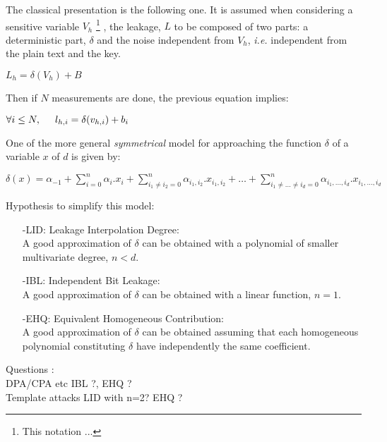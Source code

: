The classical presentation is the following one. It is assumed when considering 
a sensitive variable $V_h$ \footnote{This notation ... }
, the leakage, $L$ to be composed of two parts: 
a deterministic part, $\delta$ and the noise independent from $V_h$, \textit{i.e.} 
independent from the plain text and the key.
\begin{center}
	$L_h = \delta(V_h)  + B$
\end{center}
Then if $N$ measurements are done, the previous equation implies:
\begin{center}
	$\forall i \leq N, \hspace{5mm}  l_{h,i}= \delta(v_{h,i})  + b_i$
\end{center}
One of the more general \textit{symmetrical} model for approaching the function $\delta$ of a variable $x$ of $d$ is given by:
\begin{center}
				$\delta(x) = \alpha_{-1}  + \sum \limits_{i=0}^{n} \alpha_i.x_i 
			+ \sum \limits_{i_1 \neq i_2=0}^{n} \alpha_{i_1,i_2}.x_{i_1,i_2} + \hdots + 
			  \sum \limits_{i_1 \neq \hdots \neq i_d=0}^{n} \alpha_{i_1,\hdots,i_d}.x_{i_1,\hdots,i_d} $
\end{center} 
Hypothesis to simplify this model:
\begin{itemize}
	\item[-LID:]Leakage Interpolation Degree:\\
	A good approximation of $\delta$ can be obtained with a polynomial of smaller multivariate degree, $n <  d$.
	\item[-IBL:]Independent Bit Leakage:\\
	A good approximation of $\delta$ can be obtained with a linear function, $n=1$.
	\item[-EHQ:]Equivalent Homogeneous Contribution:\\
	A good approximation of $\delta$ can be obtained assuming that 
	each homogeneous polynomial constituting $\delta$ have independently the same coefficient.
\end{itemize}
Questions :\\
DPA/CPA etc IBL ?, EHQ ?\\
Template attacks LID with n=2? EHQ ?\\



